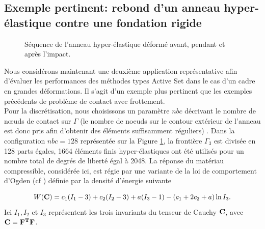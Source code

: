 \subsection{Exemple pertinent: rebond d'un anneau hyper-élastique contre une fondation rigide}
\begin{figure}[!h]
	\begin{center}
	\end{center}
	\caption{Séquence de l'anneau hyper-élastique déformé avant, pendant et après l'impact.}
	\label{ring_test}
\end{figure}
Nous considérons maintenant une deuxième application représentative afin d'évaluer les performances des méthodes types Active Set dans le cas d'un cadre en grandes déformations. Il s'agit d'un exemple plus pertinent que les exemples précédents de problème de contact avec frottement.\\
Pour la discrétisation, nous choisissons un paramètre $ nbc $ décrivant le nombre de nœuds de contact sur $ \Gamma $ (le nombre de noeuds sur le contour extérieur de l'anneau est donc pris afin d'obtenir des éléments suffisamment réguliers) . Dans la configuration $ nbc = 128 $ représentée sur la Figure \ref{ring_test}, la frontière $\Gamma_3$ est divisée en 128 parts égales, 1664 éléments finis hyper-élastiques ont été utilisés pour un nombre total de degrés de liberté égal à 2048.
La réponse du matériau compressible, considérée ici, est régie par une variante de la loi de comportement d'Ogden (cf \cite{ciarlet1982lois}) définie par la densité d'énergie suivante


%
\begin{equation}\nonumber
W({\bf C}) = c_1 (I_1 - 3) + c_2 (I_2 - 3) + a (I_3 - 1) - (c_1 + 2 c_2 + a) \ln
I_3.
\end{equation}
\noindent Ici $I_1, I_2$ et $I_3 $ représentent les trois invariants
du tenseur de Cauchy ${\bf C}$, avec ${\bf C} = {\bf F}^{\bf T} {\bf F}$. 


